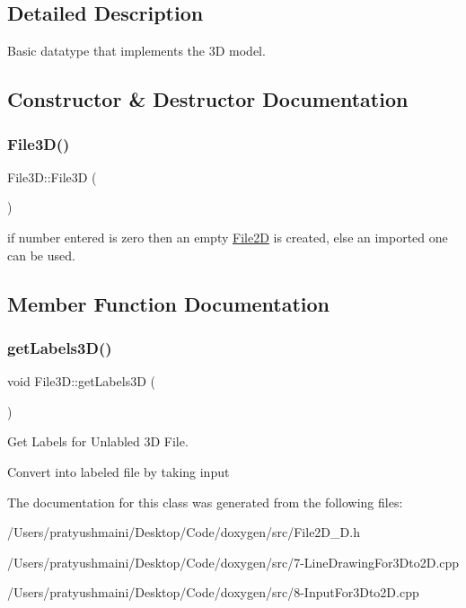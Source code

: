 \subsection{Detailed Description}
Basic datatype that implements the 3D model. 

\subsection{Constructor \& Destructor Documentation}
\mbox{\label{class_file3_d_a463dcad9b7b6cecd026c856044e19de1}} 
\subsubsection{\texorpdfstring{File3\+D()}{File3D()}}
{\footnotesize\ttfamily File3\+D\+::\+File3D (\begin{DoxyParamCaption}{ }\end{DoxyParamCaption})\hspace{0.3cm}{\ttfamily [inline]}}

if number entered is zero then an empty \mbox{\hyperlink{class_file2_d}{File2D}} is created, else an imported one can be used. 

\subsection{Member Function Documentation}
\mbox{\label{class_file3_d_a1ed0723d2c4ee571349b6efc7d5d4b48}} 
\subsubsection{\texorpdfstring{get\+Labels3\+D()}{getLabels3D()}}
{\footnotesize\ttfamily void File3\+D\+::get\+Labels3D (\begin{DoxyParamCaption}{ }\end{DoxyParamCaption})}



Get Labels for Unlabled 3D File. 

Convert into labeled file by taking input 

The documentation for this class was generated from the following files\+:\begin{DoxyCompactItemize}
\item 
/\+Users/pratyushmaini/\+Desktop/\+Code/doxygen/src/File2\+D\+\_\+D.\+h\item 
/\+Users/pratyushmaini/\+Desktop/\+Code/doxygen/src/7-\/\+Line\+Drawing\+For3\+Dto2\+D.\+cpp\item 
/\+Users/pratyushmaini/\+Desktop/\+Code/doxygen/src/8-\/\+Input\+For3\+Dto2\+D.\+cpp\end{DoxyCompactItemize}
